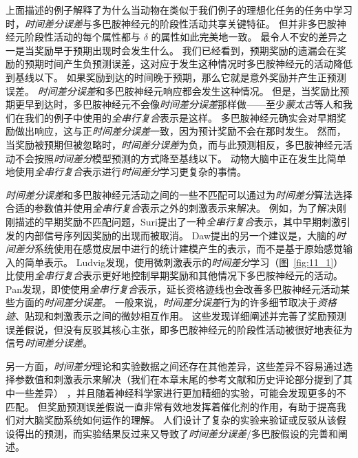 上面描述的例子解释了为什么当动物在类似于我们例子的理想化任务的任务中学习时，\textit{时间差分误差}与多巴胺神经元的阶段性活动共享关键特征。
但并非多巴胺神经元阶段性活动的每个属性都与 $\delta$ 的属性如此完美地一致。
最令人不安的差异之一是当奖励早于预期出现时会发生什么。
我们已经看到，预期奖励的遗漏会在奖励的预期时间产生负预测误差，这对应于发生这种情况时多巴胺神经元的活动降低到基线以下。
如果奖励到达的时间晚于预期，那么它就是意外奖励并产生正预测误差。
\textit{时间差分误差}和多巴胺神经元响应都会发生这种情况。
但是，当奖励比预期更早到达时，多巴胺神经元不会像\textit{时间差分误差}那样做——至少\textit{蒙太古}等人\cite{montague1996framework}和我们在我们的例子中使用的\textit{全串行复合}表示是这样。
多巴胺神经元确实会对早期奖励做出响应，这与正\textit{时间差分误差}一致，因为预计奖励不会在那时发生。
然而，当奖励被预期但被忽略时，\textit{时间差分误差}为负，而与此预测相反，多巴胺神经元活动不会按照\textit{时间差分}模型预测的方式降至基线以下\cite{hollerman1998dopamine}。
动物大脑中正在发生比简单地使用\textit{全串行复合}表示进行\textit{时间差分}学习更复杂的事情。



\textit{时间差分误差}和多巴胺神经元活动之间的一些不匹配可以通过为\textit{时间差分}算法选择合适的参数值并使用\textit{全串行复合}表示之外的刺激表示来解决。
例如，为了解决刚刚描述的早期奖励不匹配问题，Suri\cite{suri1999neural}提出了一种\textit{全串行复合}表示，其中早期刺激引发的内部信号序列因奖励的出现而被取消。
Daw\cite{daw2006representation}提出的另一个建议是，大脑的\textit{时间差分}系统使用在感觉皮层中进行的统计建模产生的表示，而不是基于原始感觉输入的简单表示。
Ludvig\cite{ludvig2008stimulus}发现，使用微刺激表示的\textit{时间差分}学习（图~\ref{fig:11_1}）比使用\textit{全串行复合}表示更好地控制早期奖励和其他情况下多巴胺神经元的活动。
Pan\cite{pan2005dopamine}发现，即使使用\textit{全串行复合}表示，延长资格迹线也会改善多巴胺神经元活动某些方面的\textit{时间差分误差}。
一般来说，\textit{时间差分误差}行为的许多细节取决于\textit{资格迹}、贴现和刺激表示之间的微妙相互作用。
这些发现详细阐述并完善了奖励预测误差假说，但没有反驳其核心主张，即多巴胺神经元的阶段性活动被很好地表征为信号\textit{时间差分误差}。


另一方面，\textit{时间差分}理论和实验数据之间还存在其他差异，这些差异不容易通过选择参数值和刺激表示来解决（我们在本章末尾的参考文献和历史评论部分提到了其中一些差异） ，并且随着神经科学家进行更加精细的实验，可能会发现更多的不匹配。
但奖励预测误差假说一直非常有效地发挥着催化剂的作用，有助于提高我们对大脑奖励系统如何运作的理解。
人们设计了复杂的实验来验证或反驳从该假设得出的预测，而实验结果反过来又导致了\textit{时间差分误差}/多巴胺假设的完善和阐述。


